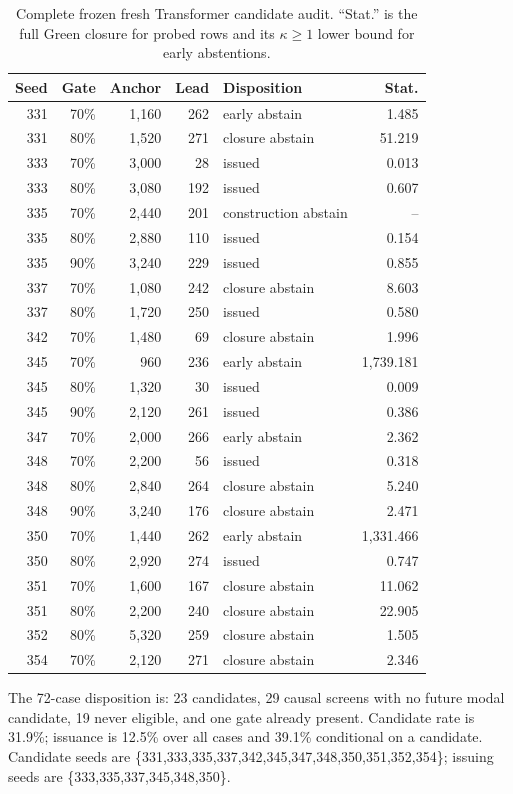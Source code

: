 \documentclass{article}
\begin{document}
\begin{table}[H]
\caption{Complete frozen fresh Transformer candidate audit.  ``Stat.'' is the
full Green closure for probed rows and its $\kappa\ge1$ lower bound for early
abstentions.}
\label{tab:allfresh}
\centering
\footnotesize
\setlength{\tabcolsep}{4.2pt}
\begin{tabular}{rrrrlr}
\toprule
Seed & Gate & Anchor & Lead & Disposition & Stat. \\
\midrule
331&70\%&1,160&262&early abstain&1.485\\
331&80\%&1,520&271&closure abstain&51.219\\
333&70\%&3,000&28&issued&0.013\\
333&80\%&3,080&192&issued&0.607\\
335&70\%&2,440&201&construction abstain&--\\
335&80\%&2,880&110&issued&0.154\\
335&90\%&3,240&229&issued&0.855\\
337&70\%&1,080&242&closure abstain&8.603\\
337&80\%&1,720&250&issued&0.580\\
342&70\%&1,480&69&closure abstain&1.996\\
345&70\%&960&236&early abstain&1,739.181\\
345&80\%&1,320&30&issued&0.009\\
345&90\%&2,120&261&issued&0.386\\
347&70\%&2,000&266&early abstain&2.362\\
348&70\%&2,200&56&issued&0.318\\
348&80\%&2,840&264&closure abstain&5.240\\
348&90\%&3,240&176&closure abstain&2.471\\
350&70\%&1,440&262&early abstain&1,331.466\\
350&80\%&2,920&274&issued&0.747\\
351&70\%&1,600&167&closure abstain&11.062\\
351&80\%&2,200&240&closure abstain&22.905\\
352&80\%&5,320&259&closure abstain&1.505\\
354&70\%&2,120&271&closure abstain&2.346\\
\bottomrule
\end{tabular}
\end{table}

The 72-case disposition is: 23 candidates, 29 causal screens with no future
modal candidate, 19 never eligible, and one gate already present.  Candidate
rate is 31.9\%; issuance is 12.5\% over all cases and 39.1\% conditional on a
candidate.  Candidate seeds are
\{331,333,335,337,342,345,347,348,350,351,352,354\}; issuing seeds are
\{333,335,337,345,348,350\}.
\end{document}
